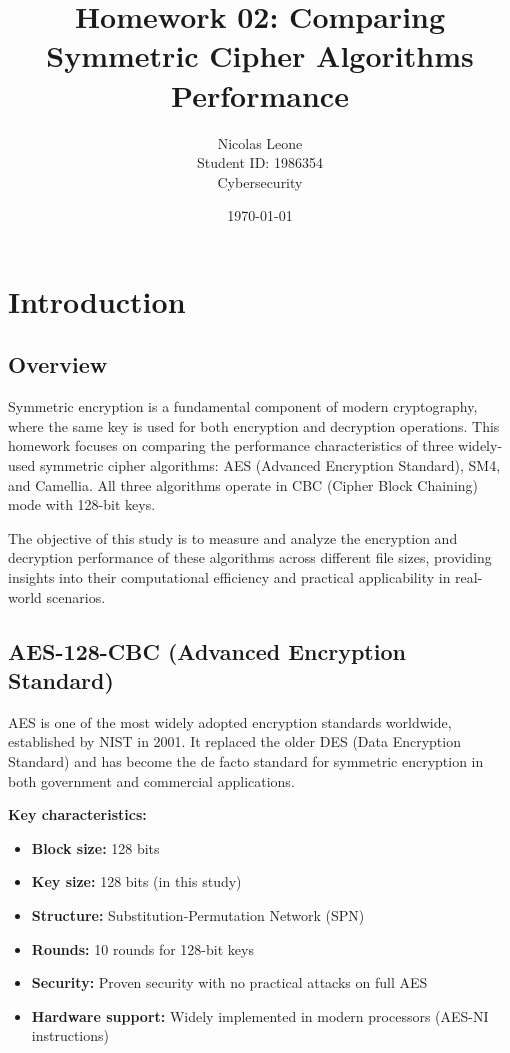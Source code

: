\documentclass[12pt,a4paper]{article}
\title{Homework 02: Comparing Symmetric Cipher Algorithms Performance}
\author{Nicolas Leone\\Student ID: 1986354\\Cybersecurity}
\date{\today}
\begin{document}
\maketitle

\tableofcontents
\newpage

\section{Introduction}

\subsection{Overview}
Symmetric encryption is a fundamental component of modern cryptography, where the same key is used for both encryption and decryption operations. This homework focuses on comparing the performance characteristics of three widely-used symmetric cipher algorithms: AES (Advanced Encryption Standard), SM4, and Camellia. All three algorithms operate in CBC (Cipher Block Chaining) mode with 128-bit keys.

The objective of this study is to measure and analyze the encryption and decryption performance of these algorithms across different file sizes, providing insights into their computational efficiency and practical applicability in real-world scenarios.

\subsection{AES-128-CBC (Advanced Encryption Standard)}
AES is one of the most widely adopted encryption standards worldwide, established by NIST in 2001. It replaced the older DES (Data Encryption Standard) and has become the de facto standard for symmetric encryption in both government and commercial applications.

\textbf{Key characteristics:}
\begin{itemize}
    \item \textbf{Block size:} 128 bits
    \item \textbf{Key size:} 128 bits (in this study)
    \item \textbf{Structure:} Substitution-Permutation Network (SPN)
    \item \textbf{Rounds:} 10 rounds for 128-bit keys
    \item \textbf{Security:} Proven security with no practical attacks on full AES
    \item \textbf{Hardware support:} Widely implemented in modern processors (AES-NI instructions)
\end{itemize}
\end{document}
